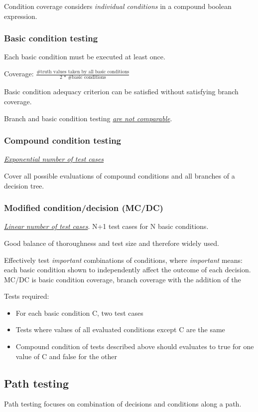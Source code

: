 \documentclass{article}
\begin{document}
Condition coverage considers \textit{individual conditions} in a compound boolean expression.

\subsubsection{Basic condition testing}
Each basic condition must be executed at least once.

Coverage: 
$\frac{\text{\# truth values taken by all basic conditions}}{\text{2 * \# basic conditions}}$

Basic condition adequacy criterion can be
satisfied without satisfying branch coverage.

Branch and basic condition testing \textit{\underline{ are not comparable}}.

\subsubsection{Compound condition testing}

\textit{\underline{Exponential number of test cases}}

Cover all possible evaluations of compound conditions and all branches of a decision tree. 

\subsubsection{Modified condition/decision (MC/DC)}
\textit{\underline{Linear number of test cases}}. N+1 test cases for N basic conditions.

Good balance of thoroughness and test size and therefore widely used. 

Effectively test \textit{important} combinations of conditions, where \textit{important} means: each basic condition shown to independently affect the outcome of each decision. MC/DC is basic condition coverage, branch coverage with the addition of the 

Tests required:
\begin{itemize}
  \item For each basic condition C, two test cases
  \item Tests where values of all evaluated conditions except C are the same
  \item Compound condition of tests described above should evaluates to true for one value of C and false for the other
\end{itemize}

\subsection{Path testing}
Path testing focuses on combination of decisions and conditions along a path.
\end{document}
